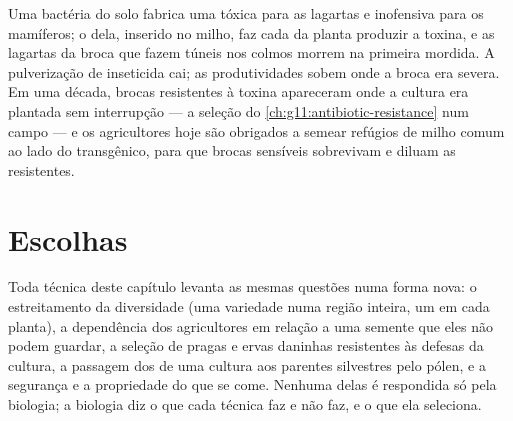 \begin{example}\label{ex:g12:domesticated-plants:bt}
Uma bactéria do solo fabrica uma  tóxica para as lagartas e
inofensiva para os mamíferos; o  dela, inserido no milho, faz cada
 da planta produzir a toxina, e as lagartas da broca que fazem
túneis nos colmos morrem na primeira mordida. A pulverização de
inseticida cai; as produtividades sobem onde a broca era severa. Em uma
década, brocas resistentes à toxina apareceram onde a cultura era
plantada sem interrupção --- a seleção do
\cref{ch:g11:antibiotic-resistance} num campo --- e os agricultores
hoje são obrigados a semear refúgios de milho comum ao lado do
transgênico, para que brocas sensíveis sobrevivam e diluam as resistentes.
\end{example}

\section{Escolhas}

\begin{proposition}\label{prop:g12:domesticated-plants:stakes}
Toda técnica deste capítulo levanta as mesmas questões numa forma nova:
o estreitamento da diversidade (uma variedade numa região inteira, um
 em cada planta), a dependência dos agricultores em relação a uma
semente que eles não podem guardar, a seleção de pragas e ervas
daninhas resistentes às defesas da cultura, a passagem dos  de uma
cultura aos parentes silvestres pelo pólen, e a segurança e a
propriedade do que se come. Nenhuma delas é respondida só pela
biologia; a biologia diz o que cada técnica faz e não faz, e o que ela seleciona.
\end{proposition}
\admitted

